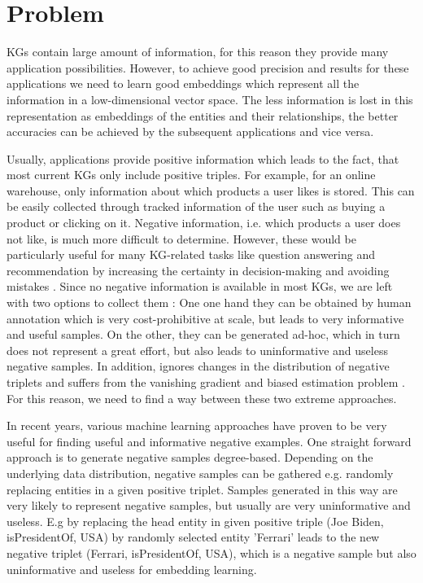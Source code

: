 \chapter{Problem}
\label{ch:problem}

\acp{KG} contain large amount of information, for this reason they provide many application possibilities.
However, to achieve good precision and results for these applications we need to learn good embeddings which represent all the information in a low-dimensional vector space.
The less information is lost in this representation as embeddings of the entities and their relationships, the better accuracies can be achieved by the subsequent applications and vice versa.

Usually, applications provide positive information which leads to the fact, that most current \acp{KG} only include positive triples.
For example, for an online warehouse, only information about which products a user likes is stored.
This can be easily collected through tracked information of the user such as buying a product or clicking on it.
Negative information, i.e. which products a user does not like, is much more difficult to determine.
However, these would be particularly useful for many \ac{KG}-related tasks like question answering and recommendation by increasing the certainty in decision-making and avoiding mistakes \cite{safavi2021negater}.
Since no negative information is available in most \acp{KG}, we are left with two options to collect them \cite{safavi2021negater}: 
One one hand they can be obtained by human annotation which is very cost-prohibitive at scale, but leads to very informative and useful samples. 
On the other, they can be generated ad-hoc, which in turn does not represent a great effort, but also leads to uninformative and useless negative samples.
In addition, ignores changes in the distribution of negative triplets and
suffers from the vanishing gradient and biased estimation problem \cite{zhang2021efficient}.
For this reason, we need to find a way between these two extreme approaches.

In recent years, various machine learning approaches have proven to be very useful for finding useful and informative negative examples.
One straight forward approach is to generate negative samples degree-based.
Depending on the underlying data distribution, negative samples can be gathered e.g. randomly replacing entities in a given positive triplet.
Samples generated in this way are very likely to represent negative samples, but usually are very uninformative and useless.
E.g by replacing the head entity in given positive triple (Joe Biden, isPresidentOf, USA) by randomly selected entity 'Ferrari' leads to the new negative triplet (Ferrari, isPresidentOf, USA), which is a negative sample but also uninformative and useless for embedding learning.

